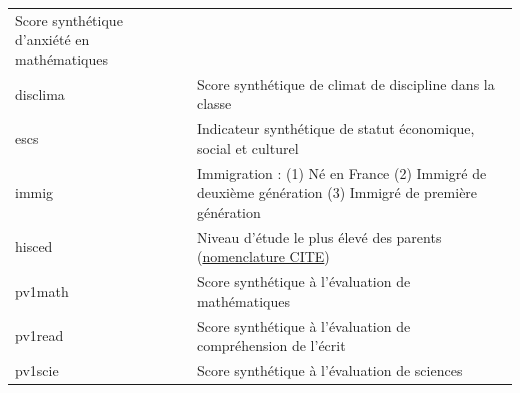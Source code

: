 \documentclass[12pt,twosided, notitlepage]{book}
\begin{document}
\begin{longtable}[]{@{}ll@{}}
\begin{minipage}[t]{0.55\columnwidth}
Score synthétique d'anxiété en mathématiques\strut
\end{minipage}\tabularnewline
\begin{minipage}[t]{0.38\columnwidth}\raggedright\strut
disclima\strut
\end{minipage} & \begin{minipage}[t]{0.55\columnwidth}\raggedright\strut
Score synthétique de climat de discipline dans la classe\strut
\end{minipage}\tabularnewline
\begin{minipage}[t]{0.38\columnwidth}\raggedright\strut
escs\strut
\end{minipage} & \begin{minipage}[t]{0.55\columnwidth}\raggedright\strut
Indicateur synthétique de statut économique, social et culturel\strut
\end{minipage}\tabularnewline
\begin{minipage}[t]{0.38\columnwidth}\raggedright\strut
immig\strut
\end{minipage} & \begin{minipage}[t]{0.55\columnwidth}\raggedright\strut
Immigration : (1) Né en France (2) Immigré de deuxième génération (3)
Immigré de première génération\strut
\end{minipage}\tabularnewline
\begin{minipage}[t]{0.38\columnwidth}\raggedright\strut
hisced\strut
\end{minipage} & \begin{minipage}[t]{0.55\columnwidth}\raggedright\strut
Niveau d'étude le plus élevé des parents
(\href{http://www.uis.unesco.org/Education/Documents/isced-2011-fr.pdf}{nomenclature
CITE})\strut
\end{minipage}\tabularnewline
\begin{minipage}[t]{0.38\columnwidth}\raggedright\strut
pv1math\strut
\end{minipage} & \begin{minipage}[t]{0.55\columnwidth}\raggedright\strut
Score synthétique à l'évaluation de mathématiques\strut
\end{minipage}\tabularnewline
\begin{minipage}[t]{0.38\columnwidth}\raggedright\strut
pv1read\strut
\end{minipage} & \begin{minipage}[t]{0.55\columnwidth}\raggedright\strut
Score synthétique à l'évaluation de compréhension de l'écrit\strut
\end{minipage}\tabularnewline
\begin{minipage}[t]{0.38\columnwidth}\raggedright\strut
pv1scie\strut
\end{minipage} & \begin{minipage}[t]{0.55\columnwidth}\raggedright\strut
Score synthétique à l'évaluation de sciences\strut
\end{minipage}\tabularnewline
\bottomrule
\end{longtable}
\end{document}
